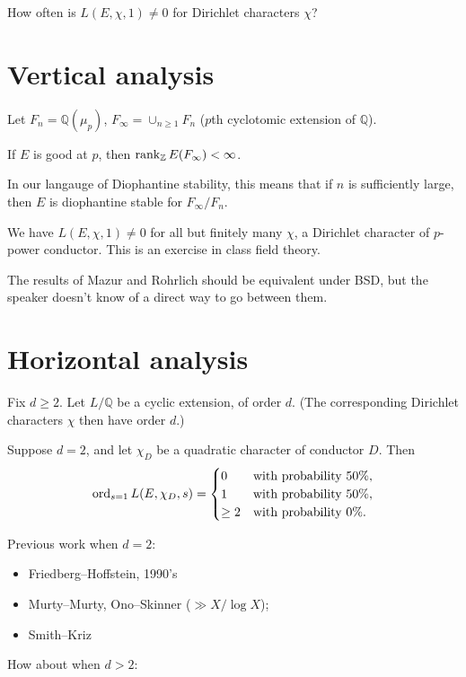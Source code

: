 \documentclass[reqno]{amsart} 
\begin{document}
\begin{question}
  How often is $L(E, \chi, 1) \neq 0$ for Dirichlet characters $\chi$?
\end{question}
\section{Vertical analysis}
Let $F_n = \mathbb{Q}(\mu_p)$, $F _\infty = \cup_{n \geq 1} F_n$ ($p$th cyclotomic extension of $\mathbb{Q}$).
\begin{theorem}[Mazur]
  If $E$ is good at $p$, then $\operatorname{rank}_{\mathbb{Z}} E(F _\infty) < \infty$.
\end{theorem}
\begin{remark}
  In our langauge of Diophantine stability, this means that if $n$ is sufficiently large, then $E$ is diophantine stable for $F _\infty / F_n$.
\end{remark}
\begin{theorem}[Rohrlich]
  We have $L(E, \chi, 1) \neq 0$ for all but finitely many $\chi$, a Dirichlet character of $p$-power conductor.  This is an exercise in class field theory.
\end{theorem}
\begin{remark}
  The results of Mazur and Rohrlich should be equivalent under BSD, but the speaker doesn't know of a direct way to go between them.
\end{remark}
\section{Horizontal analysis}
Fix $d \geq 2$.  Let $L / \mathbb{Q}$ be a cyclic extension, of order $d$.  (The corresponding Dirichlet characters $\chi$ then have order $d$.)

\begin{conjecture}[Goldfeld]
  Suppose $d = 2$, and let $\chi_D$ be a quadratic character of conductor $D$.  Then
  \begin{equation*}
    \operatorname{ord}_{s = 1} L(E, \chi_D, s) =
    \begin{cases}
      0      & \text{with probability } 50\%, \\
      1      & \text{with probability } 50\%, \\
      \geq 2      & \text{with probability } 0\%. \\
    \end{cases}
  \end{equation*}
\end{conjecture}
Previous work when $d = 2$:
\begin{itemize}
\item Friedberg--Hoffstein, 1990's
\item Murty--Murty, Ono--Skinner ($\gg X / \log X$);
\item Smith--Kriz
\end{itemize}
How about when $d > 2$:
\begin{conjecture}[David--Fearnley--Kisilenski]

\end{conjecture}
\end{document}
